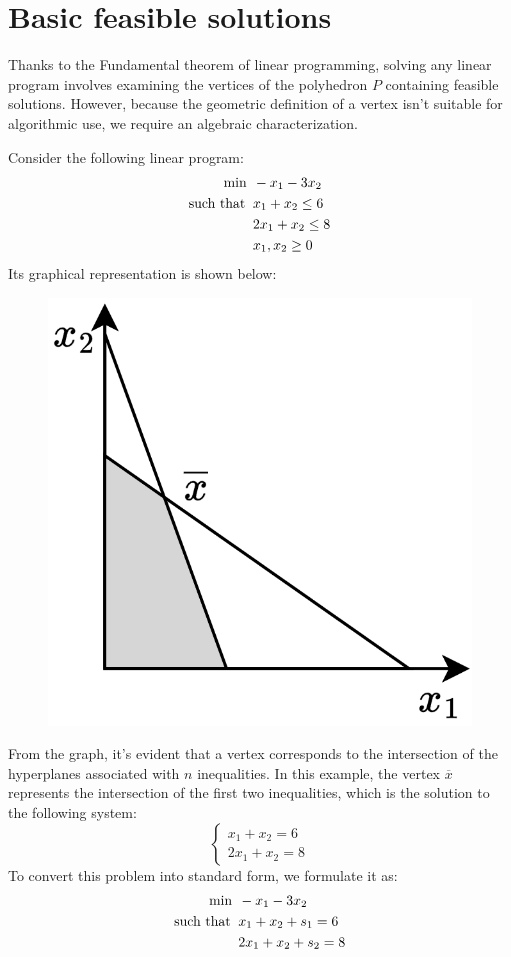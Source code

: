 \section{Basic feasible solutions}

Thanks to the Fundamental theorem of linear programming, solving any linear program involves examining the vertices of the polyhedron $P$ containing feasible solutions.
However, because the geometric definition of a vertex isn't suitable for algorithmic use, we require an algebraic characterization.
\begin{example}
    Consider the following linear program:
    \begin{align*}
        \min                      \:&\: -x_1-3x_2          \\
        \textnormal{such that }     &\: x_1+x_2 \leq 6  \\
                                    &\: 2x_1+x_2 \leq 8  \\
                                    &\: x_1,x_2 \geq 0
    \end{align*}
    Its graphical representation is shown below:
    \begin{figure}[H]
        \centering
        \includegraphics[width=0.25\linewidth]{images/lp.png}
    \end{figure}
    From the graph, it's evident that a vertex corresponds to the intersection of the hyperplanes associated with $n$ inequalities. 
    In this example, the vertex $\overline{x}$ represents the intersection of the first two inequalities, which is the solution to the following system:
    \[
    \begin{cases}
        x_1+x_2=6 \\
        2x_1+x_2=8
    \end{cases}
    \]
    To convert this problem into standard form, we formulate it as:
    \begin{align*}
        \min                      \:&\: -x_1-3x_2          \\
        \textnormal{such that }     &\: x_1+x_2+s_1 = 6  \\
                                    &\: 2x_1+x_2+s_2 = 8  \\

\end{align*}
\end{example}
